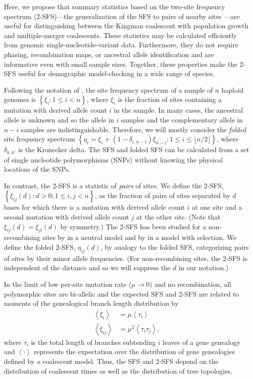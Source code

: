 \documentclass[11pt, letterpaper]{article}   	%
\newcommand{\floor}[1]{\lfloor #1 \rfloor}
\newcommand{\E}[1]{\left< #1 \right>}
\begin{document}
Here, we propose that summary statistics based on the two-site frequency spectrum (2-SFS)---the generalization of the SFS to pairs of nearby sites \autocite{Hudson2001, FerrettiEtAl2018}---are useful for distinguishing between the Kingman coalescent with population growth and multiple-merger coalescents.
These statistics may be calculated efficiently from genomic single-nucleotide-variant data.
Furthermore, they do not require phasing, recombination maps, or ancestral allele identification and are informative even with small sample sizes.
Together, these properties make the 2-SFS useful for demographic model-checking in a wide range of species.

Following the notation of \textcite{Fu1995}, the site frequency spectrum of a sample of $n$ haploid genomes is $\left\{ \xi_i : 1 \leq i < n \right\}$, where $\xi_i$ is the fraction of sites containing a mutation with derived allele count $i$ in the sample.
In many cases, the ancestral allele is unknown and so the allele in $i$ samples and the complementary allele in $n-i$ samples are indistinguishable.
Therefore, we will mostly consider the \textit{folded} site frequency spectrum $\left\{ \eta_i = \xi_i + (1-\delta_{i,n-i}) \xi_{n-i}: 1 \leq i \leq \floor{n/2} \right\}$, where $\delta_{k,k'}$ is the Kronecker delta. %
The SFS and folded SFS can be calculated from a set of single nucleotide polymorphisms (SNPs) without knowing the physical locations of the SNPs.

In contrast, the 2-SFS is a statistic of \textit{pairs} of sites.
We define the 2-SFS,
$\left\{ \xi_{ij}(d) : d > 0; 1 \leq i, j < n\right\}$,
as the fraction of pairs of sites separated by $d$ bases for which there is a mutation with derived allele count $i$ at one site and a second mutation with derived allele count $j$ at the other site.
(Note that $\xi_{ij}(d) = \xi_{ji}(d)$ by symmetry.)
The 2-SFS has been studied for a non-recombining sites by \textcite{FerrettiEtAl2018} in a neutral model and by \textcite{Xie2011a} in a model with selection.
We define the folded 2-SFS, $\eta_{ij}(d)$, by analogy to the folded SFS,  categorizing pairs of sites by their minor allele frequencies. (For non-recombining sites, the 2-SFS is independent of the distance and so we will suppress the $d$ in our notation.)

In the limit of low per-site mutation rate ($\mu\to0$) and no recombination, all polymorphic sites are bi-allelic and the expected SFS and 2-SFS are related to moments of the genealogical branch length distribution by
\begin{align}
    \E{\xi_i} &= \mu \E{\tau_i} \label{eq:expected_sfs} \\
    \E{\xi_{ij}} &= \mu^2 \E{\tau_i \tau_j},
    \label{eq:expected_2sfs}
\end{align}
where $\tau_i$ is the total length of branches subtending $i$ leaves of a gene genealogy and $\E{\cdot}$ represents the expectation over the distribution of gene genealogies defined by a coalescent model.
Thus, the SFS and 2-SFS depend on the distribution of coalescent times as well as the distribution of tree topologies.
\end{document}
